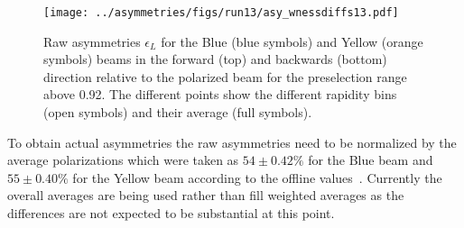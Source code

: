 \begin{figure}[ht]
\begin{center}
\texttt{[image: ../asymmetries/figs/run13/asy\_wnessdiffs13.pdf]}
\caption{Raw asymmetries $\epsilon_{L}$ for the Blue (blue symbols) and Yellow (orange symbols) beams in the forward (top) and backwards (bottom) direction relative to the polarized beam for the preselection range above 0.92. The different points show the different rapidity bins (open symbols) and their average (full symbols). \label{fig:asy_wnessdiff}}
\end{center}
\end{figure}



To obtain actual asymmetries the raw asymmetries need to be normalized by the average polarizations which were taken as 
$54 \pm 0.42 \%$ for the Blue beam and $55 \pm 0.40 \%$ for the Yellow beam according to the offline values~\cite{cite:cnipols}. 
Currently the overall averages are being used rather than fill weighted averages as the differences are not expected to be substantial 
at this point. 


